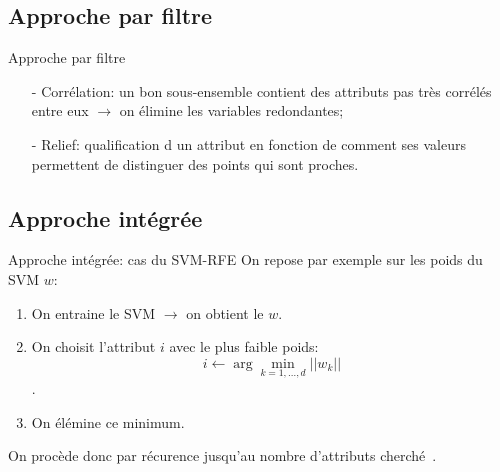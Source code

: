 \documentclass[9pt]{beamer}
\begin{document}
	\subsection[filter approach]{Approche par filtre}
	\begin{frame}{Approche par filtre}
		\begin{itemize}
			\item[-] Corrélation: un bon sous-ensemble contient des attributs pas très corrélés entre eux $\longrightarrow$ on élimine les variables redondantes;
			\item[-] Relief: qualification d un attribut en fonction de comment ses valeurs permettent de distinguer des points qui sont proches.
		\end{itemize}
	\end{frame}

	\subsection[integrated approach]{Approche intégrée}
	\begin{frame}{Approche intégrée: cas du SVM-RFE}
		On repose par exemple sur les poids du SVM $w$:
		\begin{enumerate}
			\item<1-> On entraine le SVM $\longrightarrow$ on obtient le $w$.
			\item<2-> On choisit l'attribut $i$ avec le plus faible poids:
			$$ i \leftarrow \arg \min_{k=1,\dots,d}{\vert\vert w_k\vert\vert}$$.
			\item<3-> On élémine ce minimum.
		\end{enumerate}
		On procède donc par récurence jusqu'au nombre d'attributs cherché~\cite{Guyon2002}.
	\end{frame}
\end{document}
